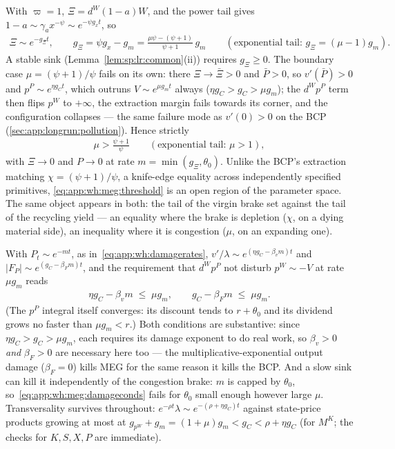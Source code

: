  With $\varpi=1$,
$\Xi=d^W\left(1-a\right)W$, and the power tail gives
$1-a\sim\gamma_ax^{-\psi}\sim e^{-\psi g_xt}$, so
\begin{align}
\Xi\sim e^{-g_\Xi t},
\qquad
g_\Xi=\psi g_x-g_m=\frac{\mu\psi-\left(\psi+1\right)}{\psi+1}\,g_m
\qquad
\left(\text{exponential tail: }g_\Xi=\left(\mu-1\right)g_m\right).
\label{eq:app:wh:meg:sink}
\end{align}
A stable sink (Lemma~\ref{lem:sp:lr:common}(ii)) requires $g_\Xi\ge0$. The boundary case
$\mu=\left(\psi+1\right)/\psi$ fails on its own: there $\Xi\to\bar\Xi>0$ and $\bar P>0$, so
$v'\left(\bar P\right)>0$ and $p^P\sim e^{\eta g_Ct}$, which outruns $V\sim e^{\mu g_mt}$
always ($\eta g_C>g_C>\mu g_m$); the $d^Wp^P$ term then flips $p^W$ to $+\infty$, the
extraction margin fails towards its corner, and the configuration collapses --- the same
failure mode as $v'\left(0\right)>0$ on the BCP (\ref{sec:app:longrun:pollution}). Hence
strictly
\begin{align}
\mu>\frac{\psi+1}{\psi}
\qquad\left(\text{exponential tail: }\mu>1\right),
\label{eq:app:wh:meg:threshold}
\end{align}
with $\Xi\to0$ and $P\to0$ at rate $m=\min\left(g_\Xi,\theta_0\right)$. Unlike the BCP's
extraction matching $\chi=\left(\psi+1\right)/\psi$, a knife-edge equality across
independently specified primitives, \eqref{eq:app:wh:meg:threshold} is an open region of the
parameter space. The same object appears in both: the tail of the virgin brake set against
the tail of the recycling yield --- an equality where the brake is depletion ($\chi$, on a
dying material side), an inequality where it is congestion ($\mu$, on an expanding one).

 With $P_t\sim e^{-mt}$, as
in~\eqref{eq:app:wh:damagerates},
$v'/\lambda\sim e^{\left(\eta g_C-\beta_vm\right)t}$ and
$\left|F_P\right|\sim e^{\left(g_C-\beta_Fm\right)t}$, and the requirement that $d^Wp^P$ not
disturb $p^W\sim-V$ at rate $\mu g_m$ reads
\begin{align}
\eta g_C-\beta_vm\;\le\;\mu g_m,
\qquad
g_C-\beta_Fm\;\le\;\mu g_m .
\label{eq:app:wh:meg:damageconds}
\end{align}
(The $p^P$ integral itself converges: its discount tends to $r+\theta_0$ and its dividend
grows no faster than $\mu g_m<r$.) Both conditions are substantive: since
$\eta g_C>g_C>\mu g_m$, each requires its damage exponent to do real work, so $\beta_v>0$
\emph{and} $\beta_F>0$ are necessary here too --- the multiplicative-exponential output
damage ($\beta_F=0$) kills MEG for the same reason it kills the BCP. And a slow sink can kill
it independently of the congestion brake: $m$ is capped by $\theta_0$,
so~\eqref{eq:app:wh:meg:damageconds} fails for $\theta_0$ small enough however large $\mu$.
Transversality survives throughout:
$e^{-\rho t}\lambda\sim e^{-\left(\rho+\eta g_C\right)t}$ against state-price products
growing at most at $g_{p^W}+g_m=\left(1+\mu\right)g_m<g_C<\rho+\eta g_C$ (for $M^K$; the
checks for $K,S,X,P$ are immediate).

